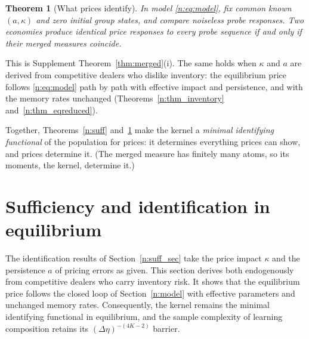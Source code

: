 \documentclass[12pt]{article}
\newtheorem{theorem}{Theorem}[section]
\theoremstyle{definition}
\theoremstyle{remark}
\begin{document}
\begin{theorem}[What prices identify]\label{n:ident}
In model \eqref{n:eq:model}, fix common known $(a,\kappa)$ and zero initial group states, and compare noiseless probe responses. Two economies produce identical price responses to every probe sequence if and only if their merged measures coincide.
\end{theorem}

This is Supplement Theorem~\ref{thm:merged}(i). The same holds when $\kappa$ and $a$ are derived from competitive dealers who dislike inventory: the equilibrium price follows \eqref{n:eq:model} path by path with effective impact and persistence, and with the memory rates unchanged (Theorems~\ref{n:thm_inventory} and~\ref{n:thm_eqreduced}).

Together, Theorems~\ref{n:suff} and~\ref{n:ident} make the kernel a \emph{minimal identifying functional} of the population for prices: it determines everything prices can show, and prices determine it. (The merged measure has finitely many atoms, so its moments, the kernel, determine it.)


\section{Sufficiency and identification in equilibrium}\label{n:sec_equilibrium}

The identification results of Section~\ref{n:suff_sec} take the price impact $\kappa$ and the persistence $a$ of pricing errors as given. This section derives both endogenously from competitive dealers who carry inventory risk. It shows that the equilibrium price follows the closed loop of Section~\ref{n:model} with effective parameters and unchanged memory rates. Consequently, the kernel remains the minimal identifying functional in equilibrium, and the sample complexity of learning composition retains its $(\Delta\eta)^{-(4K-2)}$ barrier.
\end{document}
